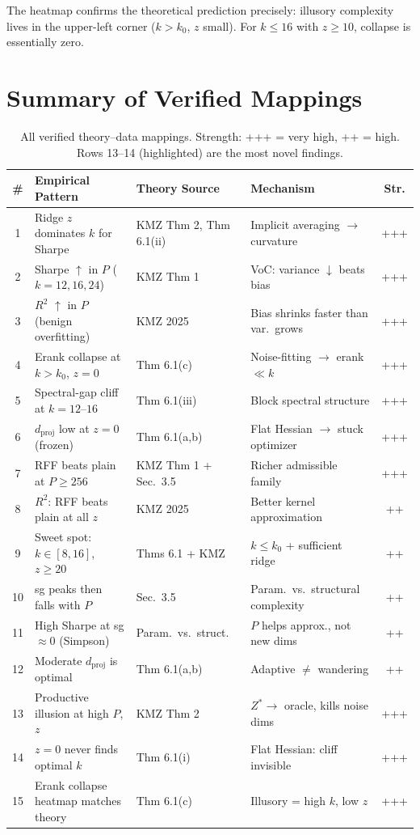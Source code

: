 \documentclass[11pt,a4paper]{article}
\begin{document}
The heatmap confirms the theoretical prediction precisely: illusory complexity lives in the upper-left corner ($k > k_0$, $z$ small).  For $k \leq 16$ with $z \geq 10$, collapse is essentially zero.


\section{Summary of Verified Mappings}

\begin{table}[H]
\centering\small
\setlength{\tabcolsep}{3pt}
\begin{tabular}{clllc}
\toprule
\# & Empirical Pattern & Theory Source & Mechanism & Str. \\
\midrule
1 & Ridge $z$ dominates $k$ for Sharpe & KMZ Thm 2, Thm 6.1(ii) & Implicit averaging $\to$ curvature & +++ \\
2 & Sharpe $\uparrow$ in $P$ ($k = 12, 16, 24$) & KMZ Thm 1 & VoC: variance $\downarrow$ beats bias & +++ \\
3 & $R^2$ $\uparrow$ in $P$ (benign overfitting) & KMZ 2025 & Bias shrinks faster than var.\ grows & +++ \\
4 & Erank collapse at $k > k_0$, $z = 0$ & Thm 6.1(c) & Noise-fitting $\to$ erank $\ll k$ & +++ \\
5 & Spectral-gap cliff at $k = 12$--$16$ & Thm 6.1(iii) & Block spectral structure & +++ \\
6 & $d_{\mathrm{proj}}$ low at $z = 0$ (frozen) & Thm 6.1(a,b) & Flat Hessian $\to$ stuck optimizer & +++ \\
7 & RFF beats plain at $P \geq 256$ & KMZ Thm 1 + Sec.~3.5 & Richer admissible family & +++ \\
8 & $R^2$: RFF beats plain at all $z$ & KMZ 2025 & Better kernel approximation & ++ \\
9 & Sweet spot: $k \in [8,16]$, $z \geq 20$ & Thms 6.1 + KMZ & $k \leq k_0$ + sufficient ridge & ++ \\
10 & sg peaks then falls with $P$ & Sec.~3.5 & Param.\ vs.\ structural complexity & ++ \\
11 & High Sharpe at sg $\approx 0$ (Simpson) & Param.\ vs.\ struct.\ & $P$ helps approx., not new dims & ++ \\
12 & Moderate $d_{\mathrm{proj}}$ is optimal & Thm 6.1(a,b) & Adaptive $\neq$ wandering & ++ \\
\rowcolor{boxblue}
13 & Productive illusion at high $P$, $z$ & KMZ Thm 2 & $Z^* \to$ oracle, kills noise dims & +++ \\
\rowcolor{boxblue}
14 & $z = 0$ never finds optimal $k$ & Thm 6.1(i) & Flat Hessian: cliff invisible & +++ \\
15 & Erank collapse heatmap matches theory & Thm 6.1(c) & Illusory = high $k$, low $z$ & +++ \\
\bottomrule
\end{tabular}
\caption{All verified theory--data mappings.  Strength: +++ = very high, ++ = high.
  Rows 13--14 (highlighted) are the most novel findings.}
\label{tab:summary}
\end{table}
\end{document}
